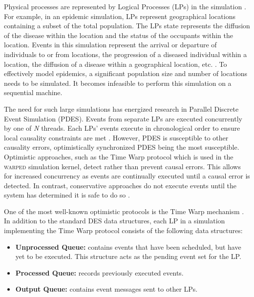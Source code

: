 \documentclass[11pt]{book}
\begin{document}
Physical processes are represented by Logical Processes (LPs) in the simulation
\cite{des_misra}.  For example, in an epidemic simulation, LPs represent
geographical locations containing a subset of the total population.  The LPs
state represents the diffusion of the disease within the location and the status
of the occupants within the location.  Events in this simulation represent the
arrival or departure of individuals to or from locations, the progression of a
diseased individual within a location, the diffusion of a disease within a
geographical location, etc. \cite{epidemic}. To effectively model epidemics, a
significant population size and number of locations needs to be simulated.  It
becomes infeasible to perform this simulation on a sequential machine.  

The need for such large simulations has energized research in Parallel Discrete Event
Simulation (PDES).  Events from separate LPs are executed concurrently by one of
\textit{N} threads.  Each LPs' events execute in chronological order to ensure local
causality constraints are met \cite{fujimoto}.  However, PDES is susceptible to other
causality errors, optimistically synchronized PDES being the most susceptible.  Optimistic
approaches, such as the Time Warp protocol which is used in the \textsc{warped} simulation kernel,
detect rather than prevent causal errors.  This allows for increased concurrency as events
are continually executed until a causal error is detected.  In contrast, conservative
approaches do not execute events until the system has determined it is safe to do so
\cite{fujimoto}.

One of the most well-known optimistic protocols is the Time Warp mechanism
\cite{fujimoto}.  In addition to the standard DES data structures, each LP in a simulation
implementing the Time Warp protocol consists of the following data structures:

\begin{itemize}
  \item \textbf{Unprocessed Queue:} contains events that have been scheduled, but have yet
    to be executed.  This structure acts as the pending event set for the LP.
  \item\textbf{Processed Queue:} records previously executed events.
  \item\textbf{Output Queue:} contains event messages sent to other LPs.
\end{itemize}
\end{document}

